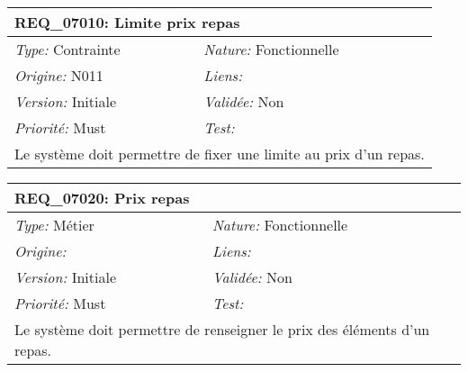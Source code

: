 \begin{table}[!ht]

\begin{tabular}{|p{60mm}p{100mm}|}

\hline

\multicolumn{2}{|l|}{\textbf{REQ\_07010:} Limite prix repas} \\ \hline

\emph{Type:} Contrainte & \emph{Nature:} Fonctionnelle \\

\emph{Origine:} N011 & \emph{Liens:}  \\

\emph{Version:} Initiale & \emph{Validée:} Non \\

\emph{Priorité:} Must & \emph{Test:} \\ \hline

\multicolumn{2}{|p{16cm}|}{Le système doit permettre de fixer une limite au prix d'un repas.} \\ \hline

\end{tabular}

\end{table}



\begin{table}[!ht]

\begin{tabular}{|p{60mm}p{100mm}|}

\hline

\multicolumn{2}{|l|}{\textbf{REQ\_07020:} Prix repas} \\ \hline

\emph{Type:} Métier & \emph{Nature:} Fonctionnelle \\

\emph{Origine:}  & \emph{Liens:}  \\

\emph{Version:} Initiale & \emph{Validée:} Non \\

\emph{Priorité:} Must & \emph{Test:} \\ \hline

\multicolumn{2}{|p{16cm}|}{Le système doit permettre de renseigner le prix des éléments d'un repas.} \\ \hline

\end{tabular}

\end{table}



